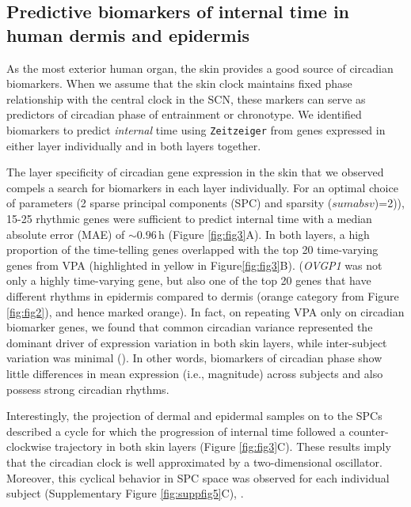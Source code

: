 
\subsection*{Predictive biomarkers of internal time in human dermis and epidermis}
As the most exterior human organ, the skin provides a good source of circadian biomarkers. When we assume that the skin clock maintains fixed phase relationship with the central clock in the SCN, these markers can serve as predictors of circadian phase of entrainment or chronotype. We identified biomarkers to predict \textit{internal} time using \texttt{Zeitzeiger} from genes expressed in either layer individually and in both layers together.

The layer specificity of circadian gene expression in the skin that we observed compels a search for biomarkers in each layer individually. For an optimal choice of parameters (2 sparse principal components (SPC) and sparsity ($sumabsv$)=2)), 15-25 rhythmic genes were sufficient to predict internal time with a median absolute error (MAE) of $\sim 0.96$\,h (Figure \ref{fig:fig3}A). In both layers, a high proportion of the time-telling genes overlapped with the top 20 time-varying genes from VPA (highlighted in yellow in Figure\ref{fig:fig3}B). (\textit{OVGP1} was not only a highly time-varying gene, but also one of the top 20 genes that have different rhythms in epidermis compared to dermis (orange category from Figure \ref{fig:fig2}), and hence marked orange). In fact, on repeating VPA only on circadian biomarker genes, we found that common circadian variance represented the dominant driver of expression variation in both skin layers, while inter-subject variation  was minimal (). In other words, biomarkers of circadian phase show little differences in mean expression (i.e., magnitude) across subjects and also possess strong circadian rhythms. 

Interestingly, the projection of dermal and epidermal samples on to the SPCs described a cycle for which the progression of internal time followed a counter-clockwise trajectory in both skin layers (Figure \ref{fig:fig3}C). These results imply that the circadian clock is well approximated by a two-dimensional oscillator. Moreover, this cyclical behavior in SPC space was observed for each individual subject (Supplementary Figure \ref{fig:suppfig5}C), . \\



